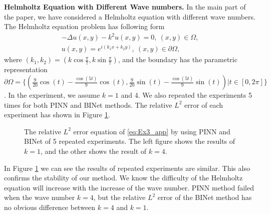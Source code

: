 \documentclass[hyperref]{article}
\numberwithin{equation}{section}
\theoremstyle{nonumberplain}
\begin{document}
	
	\textbf{Helmholtz Equation with Different Wave numbers.} In the main part of the paper, we have considered a Helmholtz equation with different wave numbers. The Helmholtz equation problem has following form
	\begin{equation}
		\begin{aligned}
			-\Delta u(x,y) - k^2u(x,y) = 0,\ (x,y)\in\Omega,\\
			u(x,y) = e^{i(k_1x+k_2y)}, \ (x,y)\in\partial\Omega,
		\end{aligned}
		\label{eq:Ex3_app}
	\end{equation}
	where $(k_1,k_2)=(k\cos \frac{\pi}{7},k\sin\frac{\pi}{7})$, and the boundary has the parametric representation $\partial\Omega=\{(\frac{9}{20}\cos(t)-\frac{\cos(5t)}{9}\cos(t),\frac{9}{20}\sin(t)-\frac{\cos(5t)}{9}\sin(t))|t\in[0,2\pi]\}$. In the experiment, we assume $k=1$ and $4$. We also repeated the experiments 5 times for both PINN and BINet methods. The relative $L^2$ error of each experiment has shown in Figure \ref{fig:app3}.
	
	
	\begin{figure}[t]
		\centering
		
		\centering
		\caption{The relative $L^2$ error equation of \eqref{eq:Ex3_app} by using PINN and BINet of 5 repeated experiments. The left figure shows the results of $k=1$, and the other shows the result of $k=4$.}
		\label{fig:app3}
	\end{figure}
	In Figure \ref{fig:app3} we can see the results of repeated experiments are similar. This also confirms the stability of our method. We know the difficulty of the Helmholtz equation will increase with the increase of the wave number. PINN method failed when the wave number $k=4$, but the relative $L^2$ error of the BINet method has no obvious difference between $k=4$ and $k=1$.
	
\end{document}
